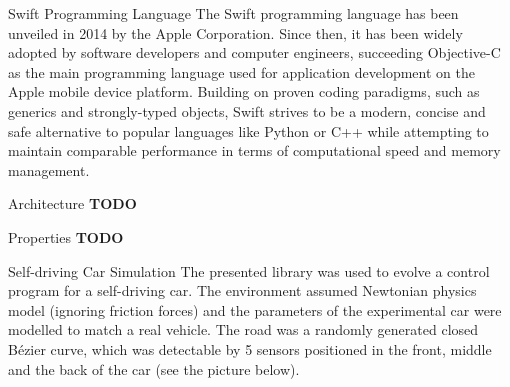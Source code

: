 \documentclass[a0paper,portrait]{baposter}
\newcommand*{\todo}{\textbf{TODO}}
\begin{document}
\begin{poster}
\begin{posterbox}[name=intro-swift,column=0,below=intro-ga]{Swift Programming Language}
	The Swift programming language has been unveiled in 2014 by the Apple Corporation. Since then, it has been widely adopted by software developers and computer engineers, succeeding Objective-C as the main programming language used for application development on the Apple mobile device platform. Building on proven coding paradigms, such as generics and strongly-typed objects, Swift strives to be a modern, concise and safe alternative to popular languages like Python or C++ while attempting to maintain comparable performance in terms of computational speed and memory management.
\end{posterbox}

\begin{posterbox}[name=arch,column=1]{Architecture}
	\todo
\end{posterbox}

\begin{posterbox}[name=props,column=1,below=arch]{Properties}
	\todo
\end{posterbox}

\begin{posterbox}[name=car,column=1,below=props]{Self-driving Car Simulation}
	The presented library was used to evolve a control program for a self-driving car. The environment assumed Newtonian physics model (ignoring friction forces) and the parameters of the experimental car were modelled to match a real vehicle. The road was a randomly generated closed Bézier curve, which was detectable by 5 sensors positioned in the front, middle and the back of the car (see the picture below).

	\vspace{0.5em}


\end{posterbox}
\end{poster}
\end{document}
